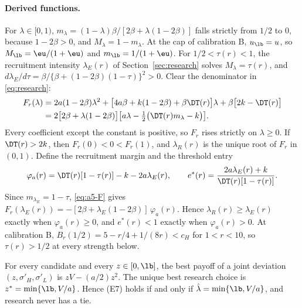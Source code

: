 \paragraph{Derived functions.}
For \(\lambda\in[0,1)\), \(m_\lambda=(1-\lambda)\beta/[2\beta+\lambda(1-2\beta)]\) falls strictly from \(1/2\) to
\(0\), because \(1-2\beta>0\), and \(M_\lambda=1-m_\lambda\). At the cap of calibration B, \(u_{\lb}=u\), so
\(M_{\lb}=\eu/(1+\eu)\) and \(m_{\lb}=1/(1+\eu)\). For \(1/2<\tau(r)<1\), the recruitment intensity
\(\lambda_E(r)\) of Section~\ref{sec:research} solves \(M_\lambda=\tau(r)\), and
\(d\lambda_E/d\tau=\beta/\{\beta+(1-2\beta)(1-\tau)\}^2>0\). Clear the denominator in \eqref{eq:research}:
\begin{equation}\label{eq:a5-F}
\begin{aligned}
F_r(\lambda)&=2a(1-2\beta)\lambda^2+\bigl[4a\beta+k(1-2\beta)+\beta\DT(r)\bigr]\lambda+\beta\bigl[2k-\DT(r)\bigr]\\
&=2\bigl[2\beta+\lambda(1-2\beta)\bigr]\bigl[a\lambda-\tfrac12\bigl(\DT(r)m_\lambda-k\bigr)\bigr].
\end{aligned}
\end{equation}
Every coefficient except the constant is positive, so \(F_r\) rises strictly on \(\lambda\ge0\). If \(\DT(r)>2k\),
then \(F_r(0)<0<F_r(1)\), and \(\lambda_R(r)\) is the unique root of \(F_r\) in \((0,1)\). Define the recruitment
margin and the threshold entry
\[
\varphi_a(r)=\DT(r)[1-\tau(r)]-k-2a\lambda_E(r),\qquad e^*(r)=\frac{2a\lambda_E(r)+k}{\DT(r)[1-\tau(r)]}.
\]
Since \(m_{\lambda_E}=1-\tau\), \eqref{eq:a5-F} gives \(F_r(\lambda_E(r))=-[2\beta+\lambda_E(1-2\beta)]\,\varphi_a(r)\).
Hence \(\lambda_R(r)\ge\lambda_E(r)\) exactly when \(\varphi_a(r)\ge0\), and \(e^*(r)<1\) exactly when
\(\varphi_a(r)>0\). At calibration B, \(B_r(1/2)=5-r/4+1/(8r)<c_H\) for \(1<r<10\), so \(\tau(r)>1/2\) at every
strength below.

\begin{lemma}\label{lem:a5-joint}
For every candidate and every \(z\in[0,\lb]\), the best payoff of a joint deviation \((z,\sigma'_H,\sigma'_L)\) is
\(zV-(a/2)z^2\). The unique best research choice is \(z^*=\min\{\lb,V/a\}\). Hence (E7) holds if and only if
\(\hat\lambda=\min\{\lb,V/a\}\), and research never has a tie.
\end{lemma}

